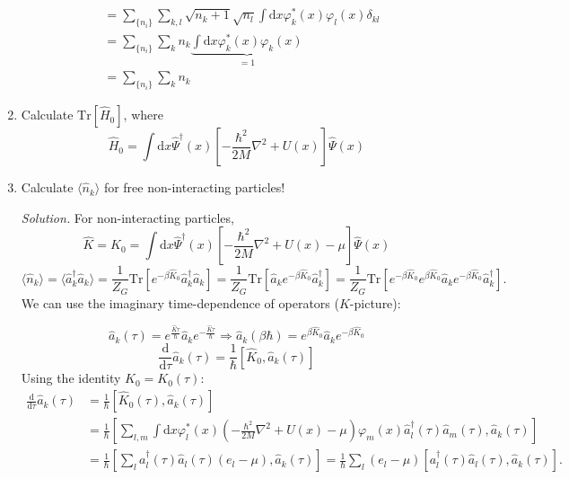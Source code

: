 \documentclass[11pt, a4paper]{article}
\newcommand{\dd}{\mathrm{d}}
\newcommand{\Tr}[1]{\mathrm{Tr}\left[#1\right]}
\begin{document}
\begin{enumerate}
\begin{align*}
        & = \sum\limits_{\{n_i\}}\sum\limits_{k,l} \sqrt{n_k+1}\sqrt{n_l} \int\dd x \varphi^*_k(x)\varphi_l(x) \delta_{kl} \\
        & = \sum\limits_{\{n_i\}}\sum\limits_{k} n_k \underbrace{\int\dd x \varphi^*_k(x)\varphi_k(x)}_{=1}\\
        & = \sum\limits_{\{n_i\}}\sum\limits_{k} n_k
    \end{align*}
    \item Calculate $\Tr {\hat H_0}$, where
    \begin{equation*}
        \hat H_0 = \int\dd x \hat\Psi^{\dagger}(x)\left[ -\frac{\hbar^2}{2M}\nabla^2 + U(x) \right]\hat\Psi(x)
    \end{equation*}
    \item Calculate $\langle \hat n_k \rangle$ for free non-interacting particles!
    \par \textit{Solution.}
    For non-interacting particles,
    \begin{equation*}
        \hat K = \hat K_0 = \int\dd x \hat\Psi^{\dagger}(x)\left[ -\frac{\hbar^2}{2M}\nabla^2 + U(x) - \mu \right]\hat\Psi(x)
    \end{equation*}
    \begin{equation*}
        \langle \hat n_k \rangle = \langle \hat a_k^{\dagger}\hat a_k \rangle
        = \frac{1}{Z_G}\Tr{e^{-\beta \hat K_0}\hat a_k^{\dagger}\hat a_k} 
        = \frac{1}{Z_G}\Tr{\hat a_ke^{-\beta \hat K_0}\hat a_k^{\dagger}}
        = \frac{1}{Z_G}\Tr{e^{-\beta \hat K_0}e^{\beta \hat K_0}\hat a_ke^{-\beta \hat K_0}\hat a_k^{\dagger}}.
    \end{equation*}
    We can use the imaginary time-dependence of operators ($K$-picture):
    

    \begin{equation*}
        \hat a_k(\tau) = e^{\frac{\hat K\tau}{\hbar}}\hat a_k e^{-\frac{\hat K\tau}{\hbar}}
        \Longrightarrow
        \hat a_k(\beta\hbar) = e^{\beta \hat K_0}\hat a_ke^{-\beta \hat K_0}
    \end{equation*}
    \begin{equation*}
        \frac{\dd}{\dd\tau}\hat a_k(\tau) = \frac{1}{\hbar}[\hat K_0, \hat a_k(\tau)]
    \end{equation*}
    Using the identity $K_0 = K_0(\tau)$:
    \begin{align*}
        \frac{\dd}{\dd\tau}\hat a_k(\tau) &= \frac{1}{\hbar}[\hat K_0(\tau), \hat a_k(\tau)]\\
        & = \frac{1}{\hbar}\left[\sum\limits_{l,m}\int\dd x \varphi^*_l(x) \left(-\frac{\hbar^2}{2M}\nabla^2 + U(x) - \mu\right)
        \varphi_m(x)\hat a_l^{\dagger}(\tau)\hat a_m(\tau), \hat a_k(\tau) \right] \\
        & = \frac{1}{\hbar}\left[\sum\limits_{l}a_l^{\dagger}(\tau)\hat a_l(\tau) (e_l - \mu), \hat a_k(\tau)\right]
        = \frac{1}{\hbar}\sum\limits_{l}(e_l - \mu) \left[a_l^{\dagger}(\tau)\hat a_l(\tau), \hat a_k(\tau)\right].
    \end{align*}
    

\end{enumerate}
\end{document}
